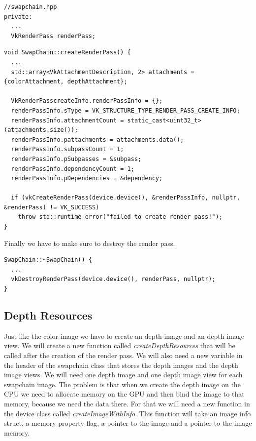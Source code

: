 \documentclass[12pt]{report} \usepackage{preamble}
\begin{document}
\begin{lstlisting}[Language=C++]
//swapchain.hpp
private:
  ...
  VkRenderPass renderPass;
\end{lstlisting}

\begin{lstlisting}[Language=C++]
void SwapChain::createRenderPass() {
  ...
  std::array<VkAttachmentDescription, 2> attachments = {colorAttachment, depthAttachment};

  VkRenderPasscreateInfo.renderPassInfo = {};
  renderPassInfo.sType = VK_STRUCTURE_TYPE_RENDER_PASS_CREATE_INFO;
  renderPassInfo.attachmentCount = static_cast<uint32_t>(attachments.size());
  renderPassInfo.pattachments = attachments.data();
  renderPassInfo.subpassCount = 1;
  renderPassInfo.pSubpasses = &subpass;
  renderPassInfo.dependencyCount = 1;
  renderPassInfo.pDependencies = &dependency;

  if (vkCreateRenderPass(device.device(), &renderPassInfo, nullptr, &renderPass) != VK_SUCCESS)
    throw std::runtime_error("failed to create render pass!");
}
\end{lstlisting}

Finally we have to make sure to destroy the render pass.

\begin{lstlisting}[Language=C++]
SwapChain::~SwapChain() {
  ...
  vkDestroyRenderPass(device.device(), renderPass, nullptr);
}
\end{lstlisting}

\subsection{Depth Resources}

Just like the color image we have to create an depth image and an depth image view. We will create a new function
called \textit{createDepthResources} that will be called after the creation of the render pass. We will also need
a new variable in the header of the swapchain class that stores the depth images and the depth image views. We will need one
depth image and one depth image view for each swapchain image. The problem is that when we create the depth image on the \ac{CPU} we
need to allocate memory on the \ac{GPU} and then bind the image to that memory, because we need the data there.
For that we will need a new function in the device class called \textit{createImageWithInfo}.
This function will take an image info struct, a memory property flag, a pointer to the image and a pointer to the image memory.
\end{document}

